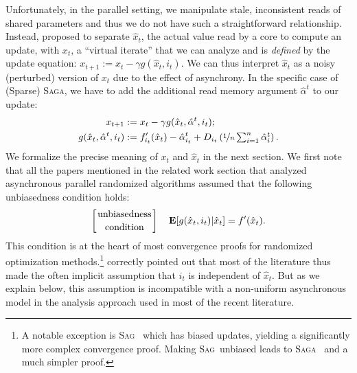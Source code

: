 \documentclass[twoside]{article}
\newcommand{\stepsize}{\gamma}
\newcommand{\Econd}{\mathbf{E}}
\newcommand{\SAGA}{\textsc{Saga}}
\newcommand{\SAG}{\textsc{Sag}}
\begin{document}
Unfortunately, in the parallel setting, we manipulate stale, inconsistent reads of shared parameters and thus we do not have such a straightforward relationship. 
Instead, \citet{mania} proposed to separate $\hat x_t$, the actual value read by a core to compute an update, with $x_t$, a ``virtual iterate'' that we can analyze and is \emph{defined} by the update equation:
$
x_{t+1} := x_t -\stepsize g(\hat x_t, i_t).
$ We can thus interpret $\hat x_t$ as a noisy (perturbed) version of $x_t$ due to the effect of asynchrony. In the specific case of (Sparse) \SAGA, we have to add the additional read memory argument $\hat{\alpha}^t$ to our update:
\begin{equation}  \label{eq:PIupdate}
\begin{aligned}
x_{t+1} &:= x_t -\stepsize g(\hat x_t, \hat \alpha^t, i_t);
\\
g(\hat x_t, \hat \alpha^t, i_t) &:= f'_{i_t}(\hat x_t) - \hat \alpha_{i_t}^t + D_{i_t} \left({\textstyle \nicefrac{1}{n} \sum_{i=1}^n \hat{\alpha}_i^t }\right).
\end{aligned}
\end{equation}
We formalize the precise meaning of $x_t$ and $\hat x_t$ in the next section. 
We first note that all the papers mentioned in the related work section that analyzed asynchronous parallel randomized algorithms assumed that the following unbiasedness condition holds:
\begin{equation} \label{eq:unbiasedness}
\left[{\text{unbiasedness} \atop \text{condition}}\right] \quad \Econd [g(\hat x_{t}, i_t) | \hat x_t] = f'(\hat x_t).
\end{equation}
This condition is at the heart of most convergence proofs for randomized optimization methods.\footnote{A notable exception is \SAG~\citep{SAG} which has biased updates, yielding a significantly more complex convergence proof. Making \SAG\ unbiased leads to \SAGA~\citep{SAGA} and a much simpler proof.}
\citet{mania} correctly pointed out that most of the literature thus made the often implicit assumption that $i_t$ is independent of $\hat{x}_t$. 
But as we explain below, this assumption is incompatible with a non-uniform asynchronous model in the analysis approach used in most of the recent literature.

\vspace{-1mm}
\end{document}
